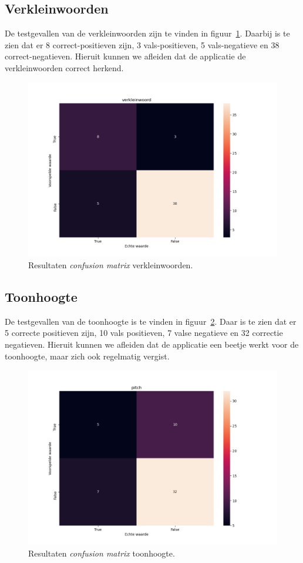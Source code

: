 \subsection{Verkleinwoorden}
De testgevallen van de verkleinwoorden zijn te vinden in figuur~\ref{fig:cfm_verkleinwoord}. Daarbij is te zien dat er 8 correct-positieven zijn, 3 vals-positieven, 5 vals-negatieve en 38 correct-negatieven.
Hieruit kunnen we afleiden dat de applicatie de verkleinwoorden correct herkend.
\begin{figure}
	\centering
	\includegraphics[width=1\textwidth]{./img/cfm_verkleinwoord}
	\caption{\label{fig:cfm_verkleinwoord} Resultaten \textit{confusion matrix} verkleinwoorden.}
\end{figure}


\subsection{Toonhoogte}
De testgevallen van de toonhoogte is te vinden in figuur~\ref{fig:cfm_pitch}. Daar is te zien dat er 5 correcte positieven zijn, 10 vals positieven, 7 valse negatieve en 32 correctie negatieven.
Hieruit kunnen we afleiden dat de applicatie een beetje werkt voor de toonhoogte, maar zich ook regelmatig vergist.

\begin{figure}
	\centering
	\includegraphics[width=1\textwidth]{./img/cfm_pitch}
	\caption{\label{fig:cfm_pitch} Resultaten \textit{confusion matrix} toonhoogte.}
\end{figure}

